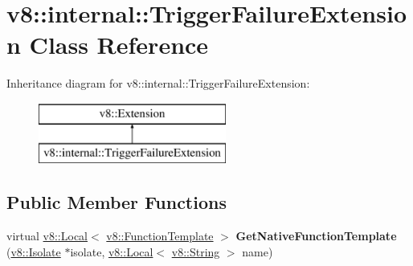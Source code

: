 \hypertarget{classv8_1_1internal_1_1_trigger_failure_extension}{}\section{v8\+:\+:internal\+:\+:Trigger\+Failure\+Extension Class Reference}
\label{classv8_1_1internal_1_1_trigger_failure_extension}
Inheritance diagram for v8\+:\+:internal\+:\+:Trigger\+Failure\+Extension\+:\begin{figure}[H]
\begin{center}
\leavevmode
\includegraphics[height=2.000000cm]{classv8_1_1internal_1_1_trigger_failure_extension}
\end{center}
\end{figure}
\subsection*{Public Member Functions}
\begin{DoxyCompactItemize}
\item 
virtual \hyperlink{classv8_1_1_local}{v8\+::\+Local}$<$ \hyperlink{classv8_1_1_function_template}{v8\+::\+Function\+Template} $>$ {\bfseries Get\+Native\+Function\+Template} (\hyperlink{classv8_1_1_isolate}{v8\+::\+Isolate} $\ast$isolate, \hyperlink{classv8_1_1_local}{v8\+::\+Local}$<$ \hyperlink{classv8_1_1_string}{v8\+::\+String} $>$ name)\hypertarget{classv8_1_1internal_1_1_trigger_failure_extension_a87103860e8763baa4da968925fdc3148}{}\label{classv8_1_1internal_1_1_trigger_failure_extension_a87103860e8763baa4da968925fdc3148}

\end{DoxyCompactItemize}

